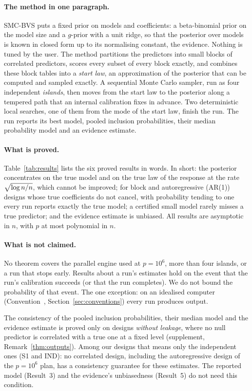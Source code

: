 \paragraph{The method in one paragraph.} SMC-BVS puts a fixed prior on models and coefficients: a beta-binomial prior on
the model size \citep{ScottBerger2010} and a $g$-prior with a unit ridge, so that the posterior over models is known in
closed form up to its normalising constant, the evidence. Nothing is tuned by the user. The method partitions the
predictors into small blocks of correlated predictors, scores every subset of every block exactly, and combines these
block tables into a \emph{start law}, an approximation of the posterior that can be computed and sampled exactly. A
sequential Monte Carlo sampler, run as four independent \emph{islands}, then moves from the start law to the posterior
along a tempered path that an internal calibration fixes in advance. Two deterministic local searches, one of them from
the mode of the start law, finish the run. The run reports its best model, pooled inclusion probabilities, their median
probability model and an evidence estimate.

\paragraph{What is proved.} Table~\ref{tab:results} lists the six proved results in words. In short: the posterior
concentrates on the true model and on the true law of the response at the rate $\sqrt{\log n/n}$, which cannot be improved; for
block and autoregressive (AR(1)) designs whose true coefficients do not cancel, with probability tending to one every run
reports exactly the true model; a certified small model rarely misses a true predictor; and
the evidence estimate is unbiased. All results are asymptotic in $n$, with $p$ at most polynomial in $n$.

\paragraph{What is not claimed.} No theorem covers the parallel engine used at $p=10^6$, more than four islands, or a run
that stops early. Results about a run's estimates hold on the event that the run's calibration succeeds (or that the run
completes). We do not bound the probability of that event. The one exception: on an idealised computer
(Convention~, Section~\ref{sec:conventions}) every run produces output.

The consistency of the pooled inclusion probabilities, their median model and the evidence estimate is proved only on
designs \emph{without leakage}, where no null predictor is correlated with a true one at a fixed level (supplement,
Remark~\ref{thm:outputs}). Among our designs that means only the independent ones (S1 and IND): no correlated design,
including the autoregressive design of the $p=10^6$ plan, has a consistency guarantee for these estimates. The reported
model (Result~3) and the evidence's unbiasedness (Result~5) do not need this condition.
